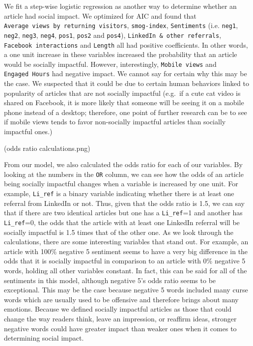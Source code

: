 \documentclass[10pt,letterpaper]{article}
\begin{document}
We fit a step-wise logistic regression as another way to determine
whether an article had social impact. We optimized for AIC and found
that \texttt{Average\ views\ by\ returning\ visitors},
\texttt{smog-index}, \texttt{Sentiments} (i.e. \texttt{neg1},
\texttt{neg2}, \texttt{neg3}, \texttt{neg4}, \texttt{pos1},
\texttt{pos2} and \texttt{pos4}),
\texttt{LinkedIn\ \&\ other\ referrals}, \texttt{Facebook\ interactions}
and \texttt{Length} all had positive coefficients. In other words, a one
unit increase in these variables increased the probability that an
article would be socially impactful. However, interestingly,
\texttt{Mobile\ views} and \texttt{Engaged\ Hours} had negative impact.
We cannot say for certain why this may be the case. We suspected that it
could be due to certain human behaviors linked to popularity of articles
that are not socially impactful (e.g.~if a cute cat video is shared on
Facebook, it is more likely that someone will be seeing it on a mobile
phone instead of a desktop; therefore, one point of further research can
be to see if mobile views tends to favor non-socially impactful articles
than socially impactful ones.)

(odds ratio calculations.png)

From our model, we also calculated the odds ratio for each of our
variables. By looking at the numbers in the \texttt{OR} column, we can
see how the odds of an article being socially impactful changes when a
variable is increased by one unit. For example, \texttt{Li\_ref} is a
binary variable indicating whether there is at least one referral from
LinkedIn or not. Thus, given that the odds ratio is 1.5, we can say that
if there are two identical articles but one has a \texttt{Li\_ref}=1 and
another has \texttt{Li\_ref}=0, the odds that the article with at least
one LinkedIn referral will be socially impactful is 1.5 times that of
the other one. As we look through the calculations, there are some
interesting variables that stand out. For example, an article with 100\%
negative 5 sentiment seems to have a very big difference in the odds
that it is socially impactful in comparison to an article with 0\%
negative 5 words, holding all other variables constant. In fact, this
can be said for all of the sentiments in this model, although negative
5's odds ratio seems to be exceptional. This may be the case because
negative 5 words included many curse words which are usually used to be
offensive and therefore brings about many emotions. Because we defined
socially impactful articles as those that could change the way readers
think, leave an impression, or reaffirm ideas, stronger negative words
could have greater impact than weaker ones when it comes to determining
social impact.
\end{document}
